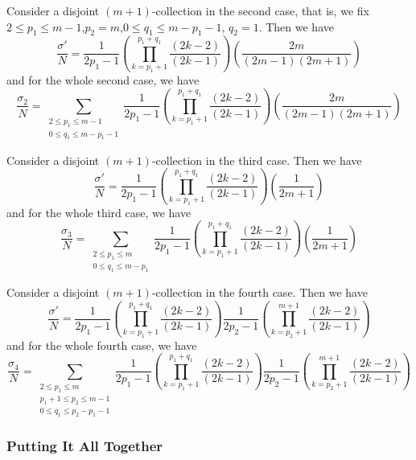 \documentclass[11pt]{article}
\theoremstyle{definition}
\theoremstyle{definition}
\theoremstyle{plain}
\theoremstyle{plain}
\theoremstyle{plain}
\theoremstyle{definition}
\begin{document}
Consider a disjoint $(m+1)$-collection in the second case, that is, we fix $2\leq p_1\leq m-1$,$p_2=m$,$0\leq q_1\leq m-p_1-1$, $q_2 = 1$. Then we have
\begin{equation*}
\frac{\sigma'}{N} = \frac{1}{2p_1-1}\left(\prod\limits_{k=p_1+1}^{p_1+q_1}\frac{(2k-2)}{(2k-1)}\right)\left(\frac{2m}{(2m-1)(2m+1)}\right)
\end{equation*}
and for the whole second case, we have
\begin{equation*}
\frac{\sigma_2}{N} = \sum\limits_{\substack{2\leq p_1\leq m-1 \\ 0\leq q_1\leq m-p_1-1}}\frac{1}{2p_1-1}\left(\prod\limits_{k=p_1+1}^{p_1+q_1}\frac{(2k-2)}{(2k-1)}\right)\left(\frac{2m}{(2m-1)(2m+1)}\right)
\end{equation*}

Consider a disjoint $(m+1)$-collection in the third case. Then we have
\begin{equation*}
\frac{\sigma'}{N} = \frac{1}{2p_1-1}\left(\prod\limits_{k=p_1+1}^{p_1+q_1}\frac{(2k-2)}{(2k-1)}\right)\left(\frac{1}{2m+1}\right)
\end{equation*}
and for the whole third case, we have
\begin{equation*}
\frac{\sigma_3}{N} = \sum\limits_{\substack{2\leq p_1\leq m \\ 0\leq q_1\leq m-p_1}}\frac{1}{2p_1-1}\left(\prod\limits_{k=p_1+1}^{p_1+q_1}\frac{(2k-2)}{(2k-1)}\right)\left(\frac{1}{2m+1}\right)
\end{equation*}

Consider a disjoint $(m+1)$-collection in the fourth case. Then we have
\begin{equation*}
\frac{\sigma'}{N} = \frac{1}{2p_1-1}\left(\prod\limits_{k=p_1+1}^{p_1+q_1}\frac{(2k-2)}{(2k-1)}\right)\frac{1}{2p_2-1}\left(\prod\limits_{k=p_2+1}^{m+1}\frac{(2k-2)}{(2k-1)}\right)
\end{equation*}
and for the whole fourth case, we have
\begin{equation*}
\frac{\sigma_4}{N} = \sum\limits_{\substack{2\leq p_1\leq m \\ p_1+1\leq p_2 \leq m-1 \\ 0\leq q_1\leq p_2-p_1-1 }}\frac{1}{2p_1-1}\left(\prod\limits_{k=p_1+1}^{p_1+q_1}\frac{(2k-2)}{(2k-1)}\right)\frac{1}{2p_2-1}\left(\prod\limits_{k=p_2+1}^{m+1}\frac{(2k-2)}{(2k-1)}\right)
\end{equation*}

\subsubsection*{Putting It All Together}
\end{document}
